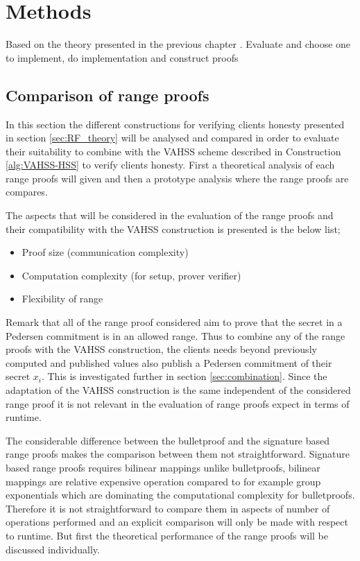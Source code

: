 \chapter{Methods}
\label{sec:Methods}
Based on the theory presented in the previous chapter .
Evaluate and choose one to implement, do implementation and construct proofs

\section{Comparison of range proofs}
In this section the different constructions for verifying clients honesty presented in section \ref{sec:RF_theory} will be analysed and compared in order to evaluate  their suitability to combine with the VAHSS scheme described in Construction \ref{alg:VAHSS-HSS} to verify clients honesty. First a theoretical analysis of each range proofs will given and then a prototype analysis where the range proofs are compares.  

The aspects that will be considered in the evaluation of the range proofs and their compatibility with the VAHSS construction is presented is the below list;
\begin{itemize}
    \item Proof size (communication complexity)
    \item Computation complexity  (for setup, prover verifier)
    \item Flexibility of range
\end{itemize}

Remark that all of the range proof considered aim to prove that the secret in a Pedersen commitment is in an allowed range. Thus to combine any of the range proofs with the VAHSS construction, the clients needs beyond previously computed and published values also publish a Pedersen commitment of their secret $x_i$. This is investigated further in section \ref{sec:combination}. Since the adaptation of the VAHSS construction is the same independent of the considered range proof it is not relevant in the evaluation of range proofs expect in terms of runtime. 

The considerable difference between the bulletproof and the signature based range proofs makes the comparison between them not straightforward.  Signature based range proofs requires bilinear mappings unlike bulletproofs, bilinear mappings are relative expensive operation compared to for example group exponentials which are dominating  the computational complexity for bulletproofs. Therefore it is not straightforward to compare them in aspects of number of operations performed and an explicit comparison will only be made with respect to runtime. But first the theoretical performance of the range proofs will be discussed individually.

